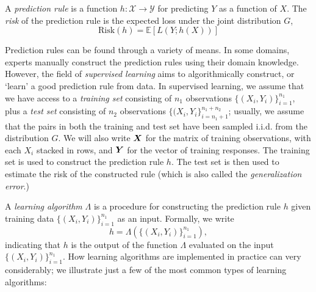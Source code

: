 A \emph{prediction rule} is a function $h: \mathcal{X} \to
\mathcal{Y}$ for predicting $Y$ as a function of $X$.  The \emph{risk}
of the prediction rule is the expected loss under the joint
distribution $G$,
\[
\text{Risk}(h) = \mathbb{E}[L(Y; h(X))]
\]

Prediction rules can be found through a variety of means.  In some
domains, experts manually construct the prediction rules using their
domain knowledge.  However, the field of \emph{supervised learning}
aims to algorithmically construct, or `learn' a good prediction rule
from data.  In supervised learning, we assume that we have access to a
\emph{training set} consisting of $n_1$ observations
$\{(X_i,Y_i)\}_{i=1}^{n_1}$, plus a \emph{test set} consisting of
$n_2$ observations $\{(X_i,Y_i\}_{i=n_1 + 1}^{n_1 + n_2}$; usually, we
assume that the pairs in both the training and test set have been
sampled i.i.d. from the distribution $G$.  We will also write $\boldsymbol{X}$
for the matrix of training observations, with each $X_i$ stacked in
rows, and $\boldsymbol{Y}$ for the vector of training responses. The training set
is used to construct the prediction rule $h$.  The test set is then
used to estimate the risk of the constructed rule (which is also
called the \emph{generalization error}.)

A \emph{learning algorithm} $\Lambda$ is a procedure for constructing the
prediction rule $h$ given training data $\{(X_i,Y_i)\}_{i=1}^{n_1}$ as
an input.  Formally, we write
\[
h = \Lambda(\{(X_i,Y_i)\}_{i=1}^{n_1}),
\]
indicating that $h$ is the output of the function $\Lambda$ evaluated
on the input $\{(X_i,Y_i)\}_{i=1}^{n_1}$.  How learning algorithms are
implemented in practice can very considerably; we illustrate just a
few of the most common types of learning algorithms:

